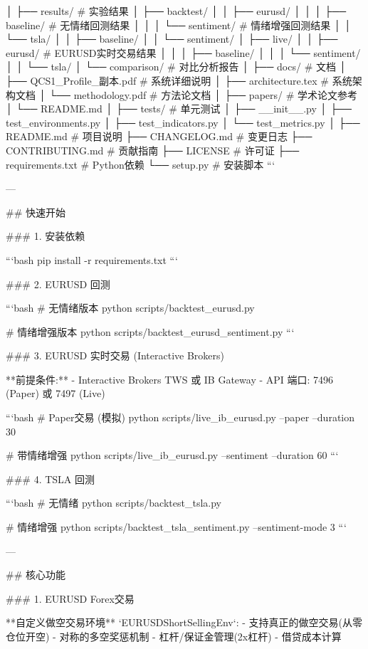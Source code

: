 │
├── results/                       # 实验结果
│   ├── backtest/
│   │   ├── eurusd/
│   │   │   ├── baseline/         # 无情绪回测结果
│   │   │   └── sentiment/         # 情绪增强回测结果
│   │   └── tsla/
│   │       ├── baseline/
│   │       └── sentiment/
│   ├── live/
│   │   ├── eurusd/               # EURUSD实时交易结果
│   │   │   ├── baseline/
│   │   │   └── sentiment/
│   │   └── tsla/
│   └── comparison/               # 对比分析报告
│
├── docs/                          # 文档
│   ├── QCS1_Profile_副本.pdf      # 系统详细说明
│   ├── architecture.tex           # 系统架构文档
│   └── methodology.pdf           # 方法论文档
│
├── papers/                        # 学术论文参考
│   └── README.md
│
├── tests/                         # 单元测试
│   ├── __init__.py
│   ├── test_environments.py
│   ├── test_indicators.py
│   └── test_metrics.py
│
├── README.md                      # 项目说明
├── CHANGELOG.md                   # 变更日志
├── CONTRIBUTING.md                # 贡献指南
├── LICENSE                        # 许可证
├── requirements.txt               # Python依赖
└── setup.py                       # 安装脚本
```

---

## 快速开始

### 1. 安装依赖

```bash
pip install -r requirements.txt
```

### 2. EURUSD 回测

```bash
# 无情绪版本
python scripts/backtest_eurusd.py

# 情绪增强版本
python scripts/backtest_eurusd_sentiment.py
```

### 3. EURUSD 实时交易 (Interactive Brokers)

**前提条件:**
- Interactive Brokers TWS 或 IB Gateway
- API 端口: 7496 (Paper) 或 7497 (Live)

```bash
# Paper交易 (模拟)
python scripts/live_ib_eurusd.py --paper --duration 30

# 带情绪增强
python scripts/live_ib_eurusd.py --sentiment --duration 60
```

### 4. TSLA 回测

```bash
# 无情绪
python scripts/backtest_tsla.py

# 情绪增强
python scripts/backtest_tsla_sentiment.py --sentiment-mode 3
```

---

## 核心功能

### 1. EURUSD Forex交易

**自定义做空交易环境** `EURUSDShortSellingEnv`:
- 支持真正的做空交易(从零仓位开空)
- 对称的多空奖惩机制
- 杠杆/保证金管理(2x杠杆)
- 借贷成本计算

